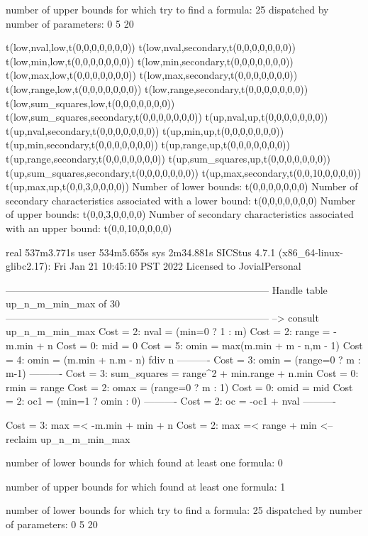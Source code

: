 number of upper bounds for which try to find a formula: 25
dispatched by number of parameters: 0  5  20

t(low,nval,low,t(0,0,0,0,0,0,0))
t(low,nval,secondary,t(0,0,0,0,0,0,0))
t(low,min,low,t(0,0,0,0,0,0,0))
t(low,min,secondary,t(0,0,0,0,0,0,0))
t(low,max,low,t(0,0,0,0,0,0,0))
t(low,max,secondary,t(0,0,0,0,0,0,0))
t(low,range,low,t(0,0,0,0,0,0,0))
t(low,range,secondary,t(0,0,0,0,0,0,0))
t(low,sum_squares,low,t(0,0,0,0,0,0,0))
t(low,sum_squares,secondary,t(0,0,0,0,0,0,0))
t(up,nval,up,t(0,0,0,0,0,0,0))
t(up,nval,secondary,t(0,0,0,0,0,0,0))
t(up,min,up,t(0,0,0,0,0,0,0))
t(up,min,secondary,t(0,0,0,0,0,0,0))
t(up,range,up,t(0,0,0,0,0,0,0))
t(up,range,secondary,t(0,0,0,0,0,0,0))
t(up,sum_squares,up,t(0,0,0,0,0,0,0))
t(up,sum_squares,secondary,t(0,0,0,0,0,0,0))
t(up,max,secondary,t(0,0,10,0,0,0,0))
t(up,max,up,t(0,0,3,0,0,0,0))
Number of lower bounds:                                             t(0,0,0,0,0,0,0)
Number of secondary characteristics associated with a lower bound:  t(0,0,0,0,0,0,0)
Number of upper bounds:                                             t(0,0,3,0,0,0,0)
Number of secondary characteristics associated with an upper bound: t(0,0,10,0,0,0,0)

real	537m3.771s
user	534m5.655s
sys	2m34.881s
SICStus 4.7.1 (x86_64-linux-glibc2.17): Fri Jan 21 10:45:10 PST 2022
Licensed to JovialPersonal


--------------------------------------------------------------------------------
Handle table up_n_m_min_max of 30
--------------------------------------------------------------------------------
--> consult up_n_m_min_max
Cost =  2:  nval        = (min=0 ? 1 : m)
Cost =  2:  range       = -m.min + n
Cost =  0:  mid         = 0
Cost =  5:  omin        = max(m.min + m - n,m - 1)
Cost =  4:  omin        = (m.min + n.m - n) fdiv n
----------
Cost =  3:  omin        = (range=0 ? m : m-1)
----------
Cost =  3:  sum_squares = range^2 + min.range + n.min
Cost =  0:  rmin        = range
Cost =  2:  omax        = (range=0 ? m : 1)
Cost =  0:  omid        = mid
Cost =  2:  oc1         = (min=1 ? omin : 0)
----------
Cost =  2:  oc          = -oc1 + nval
----------

Cost =  3:  max =< -m.min + min + n
Cost =  2:  max =< range + min
<-- reclaim up_n_m_min_max

number of lower bounds for which found at least one formula: 0

number of upper bounds for which found at least one formula: 1

number of lower bounds for which try to find a formula: 25
dispatched by number of parameters: 0  5  20

